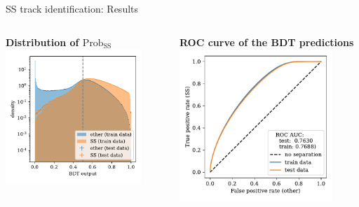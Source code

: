 \documentclass[aspectratio=1610, 10pt]{beamer}
\begin{document}
\begin{frame}{SS track identification: Results}
  \begin{columns}
    \begin{column}{0.5\textwidth}
      \centering
      \textbf{Distribution of $\text{Prob}_\text{SS}$}
      \includegraphics[width=0.85\textwidth]{images/SS_output.pdf}
    \end{column}
    \pause
    \begin{column}{0.5\textwidth}
      \centering
      \textbf{ROC curve of the BDT predictions}
      \includegraphics[width=0.85\textwidth]{images/SS_ROC.pdf}
    \end{column}
  \end{columns}
\end{frame}
\end{document}

